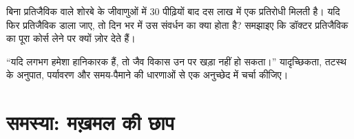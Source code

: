 \begin{exercise}[$\star\star\star$]\label{exo:g11:mutations:14}
बिना प्रतिजैविक वाले शोरबे के जीवाणुओं में 30 पीढ़ियों बाद दस लाख में एक
प्रतिरोधी  मिलती है। यदि फिर प्रतिजैविक डाला जाए, तो दिन भर में उस
संवर्धन का क्या होता है? समझाइए कि डॉक्टर प्रतिजैविक का पूरा कोर्स लेने पर
क्यों ज़ोर देते हैं।
\end{exercise}

\begin{exercise}[$\star\star\star$]\label{exo:g11:mutations:15}
``यदि  लगभग हमेशा हानिकारक हैं, तो जैव विकास उन पर खड़ा नहीं
हो सकता।'' यादृच्छिकता, तटस्थ  के अनुपात, पर्यावरण और
समय-पैमाने की धारणाओं से एक अनुच्छेद में चर्चा कीजिए।
\end{exercise}

\section{समस्या: मख़मल की छाप}

